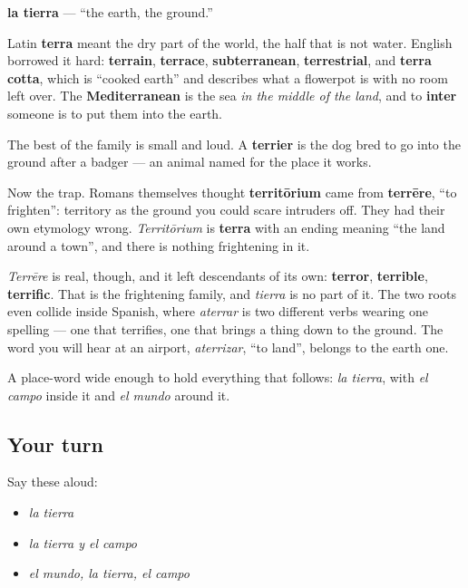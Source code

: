 \begin{cousinweb}
\textbf{la tierra} — \textquotedblleft{}the earth, the ground.\textquotedblright{}

Latin \textbf{terra} meant the dry part of the world, the half that is not water. English borrowed it hard: \textbf{terrain}, \textbf{terrace}, \textbf{subterranean}, \textbf{terrestrial}, and \textbf{terra cotta}, which is \textquotedblleft{}cooked earth\textquotedblright{} and describes what a flowerpot is with no room left over. The \textbf{Mediterranean} is the sea \emph{in the middle of the land}, and to \textbf{inter} someone is to put them into the earth.

The best of the family is small and loud. A \textbf{terrier} is the dog bred to go into the ground after a badger — an animal named for the place it works.

Now the trap. Romans themselves thought \textbf{territōrium} came from \textbf{terrēre}, \textquotedblleft{}to frighten\textquotedblright{}: territory as the ground you could scare intruders off. They had their own etymology wrong. \emph{Territōrium} is \textbf{terra} with an ending meaning \textquotedblleft{}the land around a town\textquotedblright{}, and there is nothing frightening in it.

\emph{Terrēre} is real, though, and it left descendants of its own: \textbf{terror}, \textbf{terrible}, \textbf{terrific}. That is the frightening family, and \emph{tierra} is no part of it. The two roots even collide inside Spanish, where \emph{aterrar} is two different verbs wearing one spelling — one that terrifies, one that brings a thing down to the ground. The word you will hear at an airport, \emph{aterrizar}, \textquotedblleft{}to land\textquotedblright{}, belongs to the earth one.
\end{cousinweb}

\begin{grammarlens}[title={What you've built}]
A place-word wide enough to hold everything that follows: \emph{la tierra}, with \emph{el campo} inside it and \emph{el mundo} around it.
\end{grammarlens}

\subsection*{Your turn}
Say these aloud:

\begin{itemize}
\raggedright
  \item \emph{la tierra}
  \item \emph{la tierra y el campo}
  \item \emph{el mundo, la tierra, el campo}
\end{itemize}

